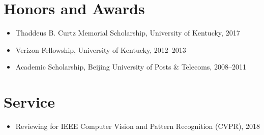 

    
\section*{Honors and Awards}
    
    \begin{itemize}

      \item Thaddeus B. Curtz Memorial Scholarship, University of Kentucky, 2017
      \item Verizon Fellowship, University of Kentucky, 2012--2013
      \item Academic Scholarship, Beijing University of Posts \& Telecoms, 2008--2011

    \end{itemize}


\section*{Service}
    
    \begin{itemize}

      \item Reviewing for IEEE Computer Vision and Pattern Recognition (CVPR), 2018

    \end{itemize}
